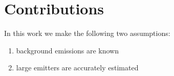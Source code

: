 




\section{Contributions}
In this work we make the following two assumptions:
\begin{enumerate}
    \item background emissions are known
    \item large emitters are accurately estimated
\end{enumerate}

